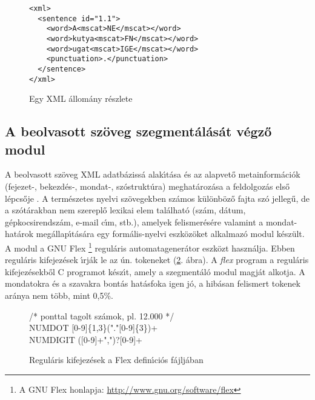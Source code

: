 \documentclass{llncs}
\begin{document}
\begin{figure}[ht]
\begin{verbatim}
<xml>
  <sentence id="1.1">
    <word>A<mscat>NE</mscat></word>
    <word>kutya<mscat>FN</mscat></word>
    <word>ugat<mscat>IGE</mscat></word>
    <punctuation>.</punctuation>
  </sentence>
</xml>
\end{verbatim}	
	\caption{Egy XML \'allom\'any r\'eszlete}
	\label{fig:xmlsample}
\end{figure}

\subsection{A beolvasott sz\"oveg szegment\'al\'as\'at v\'egz\H{o} modul}

A beolvasott sz\"oveg XML adatb\'aziss\'a alak\'\i t\'asa \'es az alapvet\H{o}
metainform\'aci\'ok (fejezet-, bekezd\'es-, mondat-, sz\'ostrukt\'ura)
meghat\'aroz\'asa a feldolgoz\'as els\H{o} l\'epcs\H{o}je\cite{bibok:mszny2003}
\cite{mihaczi:mszny2003}. A term\'eszetes nyelvi sz\"ovegekben sz\'amos
k\"ul\"onb\"oz\H{o} fajta sz\'o jelleg\H{u}, de a sz\'ot\'arakban nem szerepl\H{o}
lexikai elem tal\'alhat\'o (sz\'am, d\'atum, g\'epkocsirendsz\'am, e-mail c\'\i m, stb.),
amelyek felismer\'es\'ere valamint a mondat- hat\'arok meg\'allap\'\i t\'as\'ara
egy form\'alis-nyelvi eszk\"oz\"oket alkalmaz\'o modul k\'esz\"ult. A modul a GNU Flex
\footnote{A GNU Flex honlapja: \url{http://www.gnu.org/software/flex}}
regul\'aris automatagener\'ator eszk\"ozt haszn\'alja. Ebben regul\'aris
kifejez\'esek \'\i rj\'ak le az \'un. tokeneket (\ref{fig:regkif}. \'abra).
A {\it flex} program a regul\'aris kifejez\'esekb\H{o}l C programot k\'esz\'\i t,
amely a szegment\'al\'o modul magj\'at alkotja. A mondatokra \'es a szavakra bont\'as
hat\'asfoka igen j\'o, a hib\'asan felismert tokenek ar\'anya nem t\"obb, mint 0,5\%.

\begin{figure}[ht]
\raggedright
\begin{tt}
/* ponttal tagolt sz\'amok, pl. 12.000 */\\
NUMDOT [0-9]\{1,3\}("."[0-9]\{3\})+\\
NUMDIGIT ([0-9]+",")?[0-9]+
\end{tt}	
\vspace{-2mm}
	\caption{Regul\'aris kifejez\'esek a Flex defin\'\i ci\'os f\'ajlj\'aban}
	\label{fig:regkif}
\end{figure}
\vspace{-3mm}
\end{document}
